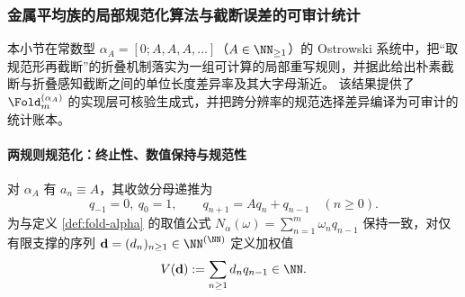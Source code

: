 \subsubsection{金属平均族的局部规范化算法与截断误差的可审计统计}\label{subsubsec:ostrowski-metallic-local-normalization-truncation-mismatch}
本小节在常数型 \(\alpha_A=[0;A,A,A,\dots]\)（\(A\in\NN_{\ge 1}\)）的 Ostrowski 系统中，把“取规范形再截断”的折叠机制落实为一组可计算的局部重写规则，并据此给出朴素截断与折叠感知截断之间的单位长度差异率及其大字母渐近。
该结果提供了 \(\Fold_m^{(\alpha_A)}\) 的实现层可核验生成式，并把跨分辨率的规范选择差异编译为可审计的统计账本。

\paragraph{两规则规范化：终止性、数值保持与规范性}
对 \(\alpha_A\) 有 \(a_n\equiv A\)，其收敛分母递推为
\[
q_{-1}=0,\ q_0=1,\qquad q_{n+1}=Aq_n+q_{n-1}\quad(n\ge 0).
\]
为与定义 \ref{def:fold-alpha} 的取值公式 \(N_\alpha(\omega)=\sum_{n=1}^m \omega_n q_{n-1}\) 保持一致，对仅有限支撑的序列 \(\mathbf d=(d_n)_{n\ge 1}\in\NN^{(\NN)}\) 定义加权值
\[
V(\mathbf d):=\sum_{n\ge 1} d_n q_{n-1}\in\NN.
\]


